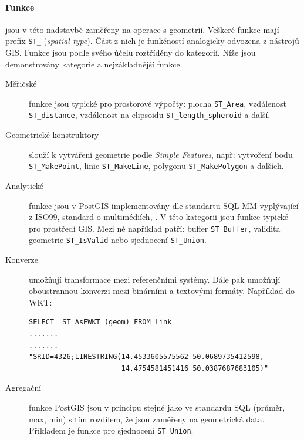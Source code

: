 \documentclass[a4paper,12pt,oneside]{report}
\begin{document}
\paragraph*{Funkce} jsou v této nadstavbě zaměřeny na operace s
geometrií. Veškeré funkce mají prefix \texttt{ST\_} (\textit{spatial
  type}). Část z nich je funkčností analogicky odvozena z nástrojů
GIS. Funkce jsou podle svého účelu roztříděny do kategorií. Níže jsou
demonstrovány kategorie a nejzákladnější funkce.
\begin{description}
\item[Měřičské] funkce jsou typické pro prostorové výpočty: plocha
  \texttt{ST\_Area}, vzdálenost \texttt{ST\_distance}, vzdálenost na
  elipsoidu \texttt{ST\_length\_spheroid} a další.

\item[Geometrické konstruktory] slouží k vytváření geometrie podle
  \textit{Simple Features}, např: vytvoření bodu \texttt{ST\_MakePoint},
  linie \texttt{ST\_MakeLine}, polygonu \texttt{ST\_MakePolygon} a
  dalších.

\item[Analytické] funkce jsou v PostGIS implementovány dle standartu
  SQL-MM vyplývající z ISO99, standard o multimédiích, 
  \cite{sqlmm}. V této kategorii jsou funkce typické pro prostředí
  GIS. Mezi ně například patří: buffer \texttt{ST\_Buffer}, validita
  geometrie \texttt{ST\_IsValid} nebo sjednocení \texttt{ST\_Union}.

\item[Konverze] umožňují transformace mezi referenčními systémy. Dále
  pak umožňují oboustrannou konverzi mezi binárními a textovými
  formáty. Například do  \acs{WKT}:

\begin{verbatim}
SELECT  ST_AsEWKT (geom) FROM link
.......
.......
"SRID=4326;LINESTRING(14.4533605575562 50.0689735412598,
                      14.4754581451416 50.0387687683105)"
\end{verbatim}

\item[Agregační] funkce PostGIS jsou v principu stejné jako ve
  standardu SQL (průměr, max, min) s tím rozdílem, že jsou zaměřeny na
  geometrická data. Příkladem je funkce pro sjednocení
  \texttt{ST\_Union}.
\end{description}




\newpage
\setcounter{footnote}{1}
\end{document}
